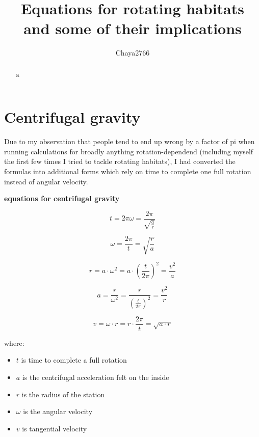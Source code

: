 \documentclass[a4paper]{article}
\title{Equations for rotating habitats\\and some of their implications}
\author{Chaya2766}
\begin{document}
	\sffamily
	\sloppy
	
	\maketitle
	
	\vfill
	
	\begin{abstract}
		a
	\end{abstract}
	
	\vfill
	
	\tableofcontents
	
	\pagebreak
	
	\section{Centrifugal gravity}
	
	Due to my observation that people tend to end up wrong by a factor of pi when running calculations for broadly anything rotation-dependend (including myself the first few times I tried to tackle rotating habitats), I had converted the formulas into additional forms which rely on time to complete one full rotation instead of angular velocity.
	
	\begin{center}
		\textbf{equations for centrifugal gravity}
	\end{center}
	
	$$ t = 2\pi\omega = \frac{2 \pi}{\sqrt{\frac{a}{r}}} $$
	
	$$ \omega = \frac{2 \pi}{t} = \sqrt{\frac{r}{a}} $$
	
	$$ r = a \cdot \omega^2 = a \cdot ( \frac{t}{2 \pi} )^2 = \frac{v^2}{a}$$
	
	$$ a = \frac{r}{\omega^2} = \frac{r}{( \frac{t}{2 \pi} )^2} = \frac{v^2}{r}$$
	
	$$ v = \omega \cdot r = r \cdot \frac{2 \pi}{t} = \sqrt{a \cdot r}$$
	
	where:
	
	\begin{itemize}
		\item $t$ is time to complete a full rotation
		
		\item $a$ is the centrifugal acceleration felt on the inside
		
		\item $r$ is the radius of the station
		
		\item $\omega$ is the angular velocity
		
		\item $v$ is tangential velocity
	\end{itemize}
	
\end{document}
